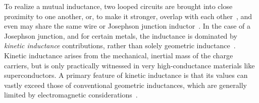 \documentclass[aip,apr,twocolumn,showpacs,superscriptaddress,groupedaddress,nofootinbib,reprint]{revtex4-1}  %
\begin{document}
%
%
%


To realize a mutual inductance, two looped circuits are brought into close proximity to one another, or, to make it stronger, overlap with each other~\cite{Johnson2011}, and even may share the same wire or Josephson junction inductor~\cite{You2005,Grajcar2006,Niskanen2007,Ashhab2008}.
%
In the case of a Josephson junction, and for certain metals, the inductance is dominated by \textit{kinetic inductance} contributions, rather than solely geometric inductance~\cite{Yoshihara2016,Niemczyk2010}. Kinetic inductance arises from the mechanical, inertial mass of the charge carriers, but is only practically witnessed in very high-conductance materials like superconductors. A primary feature of kinetic inductance is that its values can vastly exceed those of conventional geometric inductances, which are generally limited by electromagnetic considerations~\cite{Manucharyan2009}.
\end{document}
